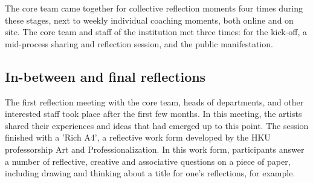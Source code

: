\documentclass[authordate, empirical]{jote-new-article}
\begin{document}
	The core team came together for collective reflection moments four times during these stages, next to weekly individual coaching moments, both online and on site. The core team and staff of the institution met three times: for the kick-off, a mid-process sharing and reflection session, and the public manifestation.







	\subsection{In-between and final reflections}







	The first reflection meeting with the core team, heads of departments, and other interested staff took place after the first few months. In this meeting, the artists shared their experiences and ideas that had emerged up to this point. The session finished with a 'Rich A4', a reflective work form developed by the HKU professorship Art and Professionalization. In this work form, participants answer a number of reflective, creative and associative questions on a piece of paper, including drawing and thinking about a title for one's reflections, for example.
\end{document}
